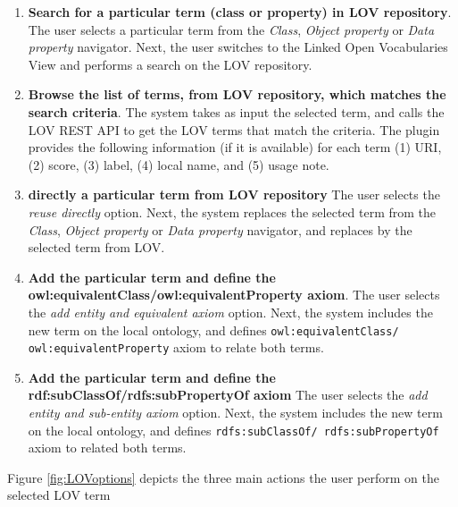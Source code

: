\begin{enumerate}
\item \textbf{Search for a particular term (class or property) in LOV repository}. 
The user selects a particular term from the \emph{Class}, \emph{Object property} or \emph{Data property} navigator. 
Next, the user switches to the Linked Open Vocabularies View and performs a search on the LOV repository.

\item \textbf{Browse the list of terms, from LOV repository, which matches the search criteria}. The system takes as input the selected term, and calls the LOV REST API to get the LOV terms that match the criteria.
The plugin provides the following information (if it is available) for each term (1) URI, (2) score, (3) label, (4) local name, and (5) usage note.

\item \textbf{directly a particular term from LOV repository}
The user selects the \emph{reuse directly} option. Next, the system replaces the selected term from the \emph{Class}, \emph{Object property} or \emph{Data property} navigator, and replaces by the selected term from LOV.

\item \textbf{Add the particular term and define the owl:equivalentClass/owl:equivalentProperty axiom}.
The user selects the \emph{add entity and equivalent axiom} option. Next, the system includes the new term on the local ontology, and defines {\tt owl:equivalentClass/ owl:equivalentProperty} axiom to relate both terms.

\item \textbf{Add the particular term and define the rdf:subClassOf/rdfs:subPropertyOf axiom}
The user selects the \emph{add entity and sub-entity axiom} option. Next, the system includes the new term on the local ontology, and defines {\tt rdfs:subClassOf/ rdfs:subPropertyOf} axiom to related both terms.

\end{enumerate}

Figure \ref{fig:LOVoptions} depicts the three main actions the user perform on the selected LOV term 




